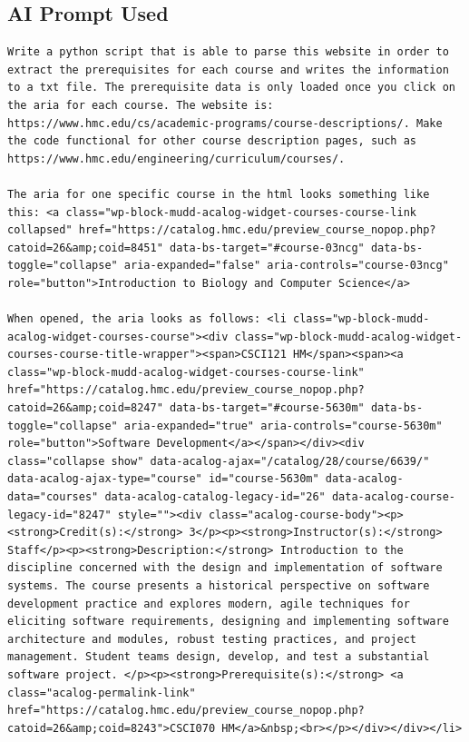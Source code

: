 \documentclass[12pt]{article}
\begin{document}
\subsection{AI Prompt Used} 
\begin{lstlisting}
Write a python script that is able to parse this website in order to extract the prerequisites for each course and writes the information to a txt file. The prerequisite data is only loaded once you click on the aria for each course. The website is: https://www.hmc.edu/cs/academic-programs/course-descriptions/. Make the code functional for other course description pages, such as https://www.hmc.edu/engineering/curriculum/courses/. 

The aria for one specific course in the html looks something like this: <a class="wp-block-mudd-acalog-widget-courses-course-link collapsed" href="https://catalog.hmc.edu/preview_course_nopop.php?catoid=26&amp;coid=8451" data-bs-target="#course-03ncg" data-bs-toggle="collapse" aria-expanded="false" aria-controls="course-03ncg" role="button">Introduction to Biology and Computer Science</a>

When opened, the aria looks as follows: <li class="wp-block-mudd-acalog-widget-courses-course"><div class="wp-block-mudd-acalog-widget-courses-course-title-wrapper"><span>CSCI121 HM</span><span><a class="wp-block-mudd-acalog-widget-courses-course-link" href="https://catalog.hmc.edu/preview_course_nopop.php?catoid=26&amp;coid=8247" data-bs-target="#course-5630m" data-bs-toggle="collapse" aria-expanded="true" aria-controls="course-5630m" role="button">Software Development</a></span></div><div class="collapse show" data-acalog-ajax="/catalog/28/course/6639/" data-acalog-ajax-type="course" id="course-5630m" data-acalog-data="courses" data-acalog-catalog-legacy-id="26" data-acalog-course-legacy-id="8247" style=""><div class="acalog-course-body"><p><strong>Credit(s):</strong> 3</p><p><strong>Instructor(s):</strong> Staff</p><p><strong>Description:</strong> Introduction to the discipline concerned with the design and implementation of software systems. The course presents a historical perspective on software development practice and explores modern, agile techniques for eliciting software requirements, designing and implementing software architecture and modules, robust testing practices, and project management. Student teams design, develop, and test a substantial software project. </p><p><strong>Prerequisite(s):</strong> <a class="acalog-permalink-link" href="https://catalog.hmc.edu/preview_course_nopop.php?catoid=26&amp;coid=8243">CSCI070 HM</a>&nbsp;<br></p></div></div></li>


\end{lstlisting}
\end{document}
